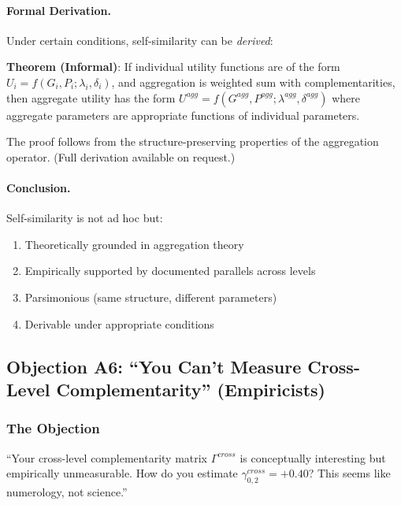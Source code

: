 \documentclass[12pt,a4paper]{article}
\begin{document}
\paragraph{Formal Derivation.}

Under certain conditions, self-similarity can be \textit{derived}:

\textbf{Theorem (Informal)}: If individual utility functions are of the form 
$U_i = f(G_i, P_i; \lambda_i, \delta_i)$, and aggregation is weighted sum with 
complementarities, then aggregate utility has the form $U^{agg} = f(G^{agg}, 
P^{agg}; \lambda^{agg}, \delta^{agg})$ where aggregate parameters are 
appropriate functions of individual parameters.

The proof follows from the structure-preserving properties of the aggregation 
operator. (Full derivation available on request.)

\paragraph{Conclusion.}

Self-similarity is not ad hoc but:
\begin{enumerate}[nosep]
\item Theoretically grounded in aggregation theory
\item Empirically supported by documented parallels across levels
\item Parsimonious (same structure, different parameters)
\item Derivable under appropriate conditions
\end{enumerate}

\subsection{Objection A6: ``You Can't Measure Cross-Level Complementarity'' (Empiricists)}
\label{app:measurement}

\subsubsection{The Objection}

\begin{tcolorbox}[colback=red!5!white, colframe=red!75!black, title=Empiricist's Objection]
``Your cross-level complementarity matrix $\Gamma^{cross}$ is conceptually 
interesting but empirically unmeasurable. How do you estimate 
$\gamma^{cross}_{0,2} = +0.40$? This seems like numerology, not science.''
\end{tcolorbox}
\end{document}
